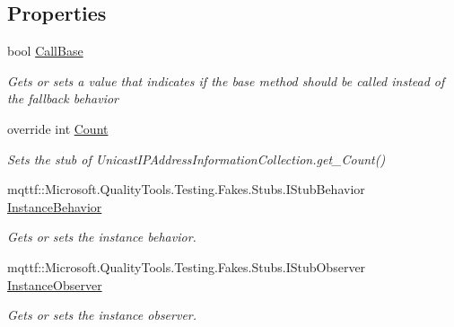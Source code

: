 \subsection*{Properties}
\begin{DoxyCompactItemize}
\item 
bool \hyperlink{class_system_1_1_net_1_1_network_information_1_1_fakes_1_1_stub_unicast_i_p_address_information_collection_a505e75c67eb1c81f5ce6135d409e62d9}{Call\-Base}
\begin{DoxyCompactList}\small\item\em Gets or sets a value that indicates if the base method should be called instead of the fallback behavior\end{DoxyCompactList}\item 
override int \hyperlink{class_system_1_1_net_1_1_network_information_1_1_fakes_1_1_stub_unicast_i_p_address_information_collection_a4138a834da82a1e097490b8d7d6009d8}{Count}
\begin{DoxyCompactList}\small\item\em Sets the stub of Unicast\-I\-P\-Address\-Information\-Collection.\-get\-\_\-\-Count()\end{DoxyCompactList}\item 
mqttf\-::\-Microsoft.\-Quality\-Tools.\-Testing.\-Fakes.\-Stubs.\-I\-Stub\-Behavior \hyperlink{class_system_1_1_net_1_1_network_information_1_1_fakes_1_1_stub_unicast_i_p_address_information_collection_a59a556af96a6dcca2a21a57bc08287b7}{Instance\-Behavior}
\begin{DoxyCompactList}\small\item\em Gets or sets the instance behavior.\end{DoxyCompactList}\item 
mqttf\-::\-Microsoft.\-Quality\-Tools.\-Testing.\-Fakes.\-Stubs.\-I\-Stub\-Observer \hyperlink{class_system_1_1_net_1_1_network_information_1_1_fakes_1_1_stub_unicast_i_p_address_information_collection_adcff4d7cf2ac2765e6eadad77149caba}{Instance\-Observer}
\begin{DoxyCompactList}\small\item\em Gets or sets the instance observer.\end{DoxyCompactList}\item 

\end{DoxyCompactItemize}
